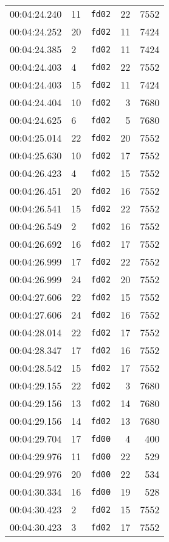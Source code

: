 \documentclass{article}
\begin{document}
\begin{longtable}{lllrr}
00:04:24.240 & 11 & \texttt{fd02} & 22 & 7552 \\
00:04:24.252 & 20 & \texttt{fd02} & 11 & 7424 \\
00:04:24.385 & 2 & \texttt{fd02} & 11 & 7424 \\
00:04:24.403 & 4 & \texttt{fd02} & 22 & 7552 \\
00:04:24.403 & 15 & \texttt{fd02} & 11 & 7424 \\
00:04:24.404 & 10 & \texttt{fd02} & 3 & 7680 \\
00:04:24.625 & 6 & \texttt{fd02} & 5 & 7680 \\
00:04:25.014 & 22 & \texttt{fd02} & 20 & 7552 \\
00:04:25.630 & 10 & \texttt{fd02} & 17 & 7552 \\
00:04:26.423 & 4 & \texttt{fd02} & 15 & 7552 \\
00:04:26.451 & 20 & \texttt{fd02} & 16 & 7552 \\
00:04:26.541 & 15 & \texttt{fd02} & 22 & 7552 \\
00:04:26.549 & 2 & \texttt{fd02} & 16 & 7552 \\
00:04:26.692 & 16 & \texttt{fd02} & 17 & 7552 \\
00:04:26.999 & 17 & \texttt{fd02} & 22 & 7552 \\
00:04:26.999 & 24 & \texttt{fd02} & 20 & 7552 \\
00:04:27.606 & 22 & \texttt{fd02} & 15 & 7552 \\
00:04:27.606 & 24 & \texttt{fd02} & 16 & 7552 \\
00:04:28.014 & 22 & \texttt{fd02} & 17 & 7552 \\
00:04:28.347 & 17 & \texttt{fd02} & 16 & 7552 \\
00:04:28.542 & 15 & \texttt{fd02} & 17 & 7552 \\
00:04:29.155 & 22 & \texttt{fd02} & 3 & 7680 \\
00:04:29.156 & 13 & \texttt{fd02} & 14 & 7680 \\
00:04:29.156 & 14 & \texttt{fd02} & 13 & 7680 \\
00:04:29.704 & 17 & \texttt{fd00} & 4 & 400 \\
00:04:29.976 & 11 & \texttt{fd00} & 22 & 529 \\
00:04:29.976 & 20 & \texttt{fd00} & 22 & 534 \\
00:04:30.334 & 16 & \texttt{fd00} & 19 & 528 \\
00:04:30.423 & 2 & \texttt{fd02} & 15 & 7552 \\
00:04:30.423 & 3 & \texttt{fd02} & 17 & 7552 \\

\end{longtable}
\end{document}
